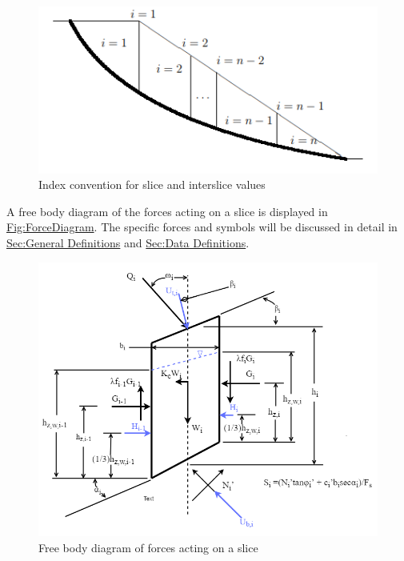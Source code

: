 \documentclass[12pt]{article}
\begin{document}
\begin{figure}[H]
\begin{center}
\includegraphics[width=\textwidth]{../../../../datafiles/ssp/IndexConvention.png}
\caption{Index convention for slice and interslice values}
\label{Figure:IndexConvention}
\end{center}
\end{figure}
A free body diagram of the forces acting on a slice is displayed in \hyperref[Figure:ForceDiagram]{Fig:ForceDiagram}. The specific forces and symbols will be discussed in detail in \hyperref[Sec:GDs]{Sec:General Definitions} and \hyperref[Sec:DDs]{Sec:Data Definitions}.

\begin{figure}[H]
\begin{center}
\includegraphics[width=\textwidth]{../../../../datafiles/ssp/ForceDiagram.png}
\caption{Free body diagram of forces acting on a slice}
\label{Figure:ForceDiagram}
\end{center}
\end{figure}
\end{document}
